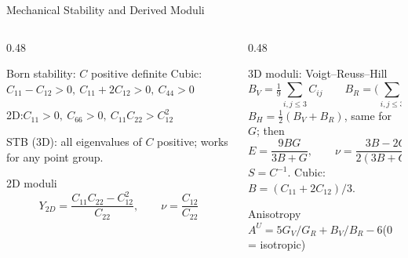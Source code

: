 \documentclass[8pt]{beamer}
\begin{document}
\begin{frame}{Mechanical Stability and Derived Moduli}
	\begin{columns}[T]
		\begin{column}{0.48\textwidth}
			\begin{block}{Born stability: $C$ positive definite}
				\small
				Cubic:\quad $C_{11}-C_{12}>0,\ C_{11}+2C_{12}>0,\ C_{44}>0$
				\par\vspace{0.1cm}
				2D:\quad $C_{11}>0,\ C_{66}>0,\ C_{11}C_{22}>C_{12}^2$
				\par\vspace{0.1cm}
				{\scriptsize STB (3D): all eigenvalues of $C$ positive; works for any
				point group.}
			\end{block}
			\begin{block}{2D moduli}
				\small
				\[ Y_{2D} = \frac{C_{11}C_{22}-C_{12}^2}{C_{22}},\qquad
				\nu = \frac{C_{12}}{C_{22}} \]
			\end{block}
		\end{column}
		\begin{column}{0.48\textwidth}
			\begin{block}{3D moduli: Voigt--Reuss--Hill}
				\small
				\[ B_V = \tfrac{1}{9}\textstyle\sum_{i,j\le3}C_{ij} \qquad
				B_R = \Big(\textstyle\sum_{i,j\le3}S_{ij}\Big)^{-1} \]
				$B_H=\tfrac12(B_V+B_R)$, same for $G$; then
				\[ E = \frac{9BG}{3B+G},\qquad \nu = \frac{3B-2G}{2(3B+G)} \]
				{\scriptsize $S = C^{-1}$. Cubic: $B = (C_{11}+2C_{12})/3$.}
			\end{block}
			\begin{block}{Anisotropy}
				\small $A^U = 5G_V/G_R + B_V/B_R - 6$\quad (0 = isotropic)
			\end{block}
		\end{column}
	\end{columns}
\end{frame}
\end{document}
